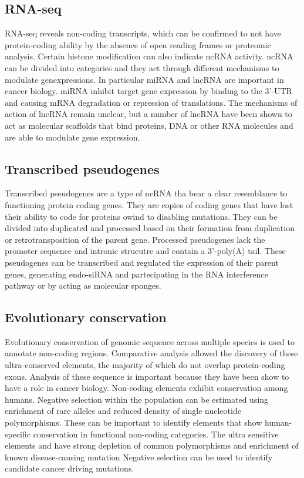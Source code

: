 	\subsection{RNA-seq}
	RNA-seq reveals non-coding transcripts, which can be confirmed to not have protein-coding ability by the absence of open reading frames or proteomic analysis.
	Certain histone modification can also indicate ncRNA activity.
	ncRNA can be divided into categories and they act through different mechanisms to modulate genexpressions.
	In particular miRNA and lncRNA are important in cancer biology.
	miRNA inhibit target gene expression by binding to the 3'-UTR and causing mRNA degradation or repression of translations.
	The mechanisms of action of lncRNA remain unclear, but a number of lncRNA have been shown to act as molecular scaffolds that bind proteins, DNA or other RNA molecules and are able to modulate gene expression.

	\subsection{Transcribed pseudogenes}
	Transcribed pseudogenes are a type of ncRNA tha bear a clear resemblance to functioning protein coding genes.
	They are copies of coding genes that have lost their ability to code for proteins owind to disabling mutations.
	They can be divided into duplicated and processed based on their formation from duplication or retrotransposition of the parent gene.
	Processed pseudogenes lack the promoter sequence and intronic strucutre and contain a 3'-poly(A) tail.
	These pseudogenes can be transcribed and regulated the expression of their parent genes, generating endo-siRNA and partecipating in the RNA interference pathway or by acting as molecular sponges.

	\subsection{Evolutionary conservation}
	Evolutionary conservation of genomic sequence across multiple species is used to annotate non-coding regions.
	Comparative analysis allowed the discovery of these ultra-conserved elements, the majority of which do not overlap protein-coding exons.
	Analysis of these sequence is important because they have been show to have a role in cancer biology.
	Non-coding elements exhibit conservation among humans.
	Negative selection within the population can be estimated using enrichment of rare alleles and reduced density of single nucleotide polymorphisms.
	These can be important to identify elements that show human-specific conservation in functional non-coding categories.
	The ultra sensitive elements and have strong depletion of common polymorphisms and enrichment of known disease-causing mutation
	Negative selection can be used to identify candidate cancer driving mutations.

